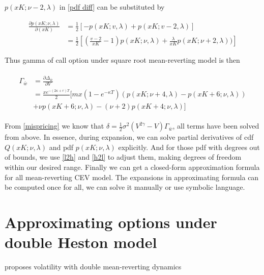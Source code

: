 \noindent $p(xK;\nu-2,\lambda)$ in \eqref{pdf diff} can be substituted by

\begin{equation}\label{pdf2}
    \begin{aligned}
        \frac{\partial p(xK;\nu,\lambda)}{\partial (xK)}&=\frac{1}{2}[-p(xK ; v, \lambda)+p(xK ; v-2, \lambda)]\\
        &=\frac{1}{2}\left[(\frac{v-2}{xK}-1) p(xK ; \nu, \lambda) + \frac{\lambda}{xK} p(xK ; \nu+2, \lambda))\right]
    \end{aligned}
\end{equation}

Thus gamma of call option under square root mean-reverting model is then

\begin{equation}\label{gamma}
    \begin{aligned}
        \begin{aligned}
            \Gamma_{\bar{w}}&= \frac{\partial \Delta_{\bar{w}}}{\partial V} \\
            &= \frac{xe^{-(2\kappa +r )T}}{2} [mx(1-e^{-\kappa T})(p(xK ; \nu+4, \lambda)-p(xK+6 ; \nu, \lambda)) \\
            &+ \nu p(xK+6 ; \nu, \lambda) - (\nu+2)p(xK+4 ; \nu, \lambda)]
            \end{aligned}
    \end{aligned}
\end{equation}

From \eqref{mispricing} we know that $\delta = \frac{1}{2} \sigma^2 (V^{2\gamma}-V) \Gamma_{\bar{w}}$, all terms have been solved from above. In essence, during expansion, we can solve partial derivatives of cdf $Q(xK;\nu,\lambda)$ and pdf $p(xK;\nu,\lambda)$ explicitly. And for those pdf with degrees out of bounds, we use \eqref{l2h} and \eqref{h2l} to adjust them, making degrees of freedom within our desired range. Finally we can get a closed-form approximation formula for all mean-reverting CEV model. The expansions in approximating formula can be computed once for all, we can solve it manually or use symbolic language.

\section{Approximating options under double Heston model}

\cite{gatheral_consistent_nodate} proposes volatility with double mean-reverting dynamics

